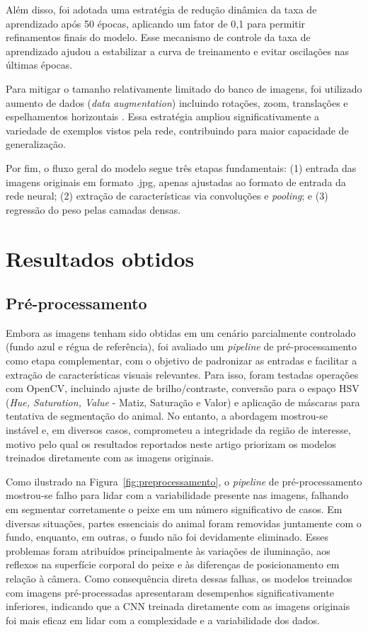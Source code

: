 \documentclass[sigconf,nonacm,screen]{acmart}
\begin{document}
Além disso, foi adotada uma estratégia de redução dinâmica da taxa de aprendizado após 50 épocas, aplicando um fator de 0,1 para permitir refinamentos finais do modelo. Esse mecanismo de controle da taxa de aprendizado ajudou a estabilizar a curva de treinamento e evitar oscilações nas últimas épocas.

Para mitigar o tamanho relativamente limitado do banco de imagens, foi utilizado aumento de dados (\textit{data augmentation}) incluindo rotações, zoom, translações e espelhamentos horizontais . Essa estratégia ampliou significativamente a variedade de exemplos vistos pela rede, contribuindo para maior capacidade de generalização.

Por fim, o fluxo geral do modelo segue três etapas fundamentais: (1) entrada das imagens originais em formato .jpg, apenas ajustadas ao formato de entrada da rede neural; (2) extração de características via convoluções e \textit{pooling}; e (3) regressão do peso pelas camadas densas.
\section{Resultados obtidos}
\subsection{Pré-processamento}
Embora as imagens tenham sido obtidas em um cenário parcialmente controlado (fundo azul e régua de referência), foi avaliado um \textit{pipeline} de pré-processamento como etapa complementar, com o objetivo de padronizar as entradas e facilitar a extração de características visuais relevantes. Para isso, foram testadas operações com OpenCV, incluindo ajuste de brilho/contraste, conversão para o espaço HSV (\textit{Hue, Saturation, Value} - Matiz, Saturação e Valor) e aplicação de máscaras para tentativa de segmentação do animal. No entanto, a abordagem mostrou-se instável e, em diversos casos, comprometeu a integridade da região de interesse, motivo pelo qual os resultados reportados neste artigo priorizam os modelos treinados diretamente com as imagens originais.


Como ilustrado na Figura~\ref{fig:preprocessamento}, o \textit{pipeline} de pré-processamento mostrou-se falho para lidar com a variabilidade presente nas imagens, falhando em segmentar corretamente o peixe em um número significativo de casos. Em diversas situações, partes essenciais do animal foram removidas juntamente com o fundo, enquanto, em outras, o fundo não foi devidamente eliminado. Esses problemas foram atribuídos principalmente às variações de iluminação, aos reflexos na superfície corporal do peixe e às diferenças de posicionamento em relação à câmera. Como consequência direta dessas falhas, os modelos treinados com imagens pré-processadas apresentaram desempenhos significativamente inferiores, indicando que a CNN treinada diretamente com as imagens originais foi mais eficaz em lidar com a complexidade e a variabilidade dos dados.
\end{document}
